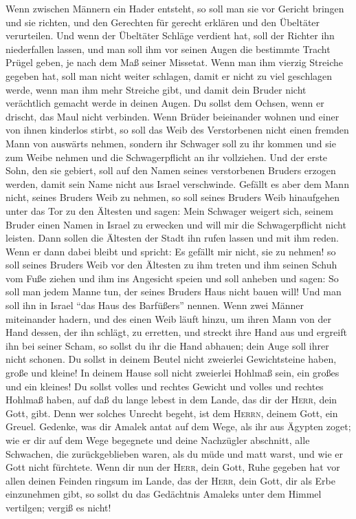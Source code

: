  Wenn zwischen Männern ein Hader entsteht, so soll man sie
vor Gericht bringen und sie richten, und den Gerechten für gerecht
erklären und den Übeltäter verurteilen.  Und wenn der
Übeltäter Schläge verdient hat, soll der Richter ihn niederfallen
lassen, und man soll ihm vor seinen Augen die bestimmte Tracht Prügel
geben, je nach dem Maß seiner Missetat.  Wenn man ihm
vierzig Streiche gegeben hat, soll man nicht weiter schlagen, damit er
nicht zu viel geschlagen werde, wenn man ihm mehr Streiche gibt, und
damit dein Bruder nicht verächtlich gemacht werde in deinen Augen.
 Du sollst dem Ochsen, wenn er drischt, das Maul nicht
verbinden.  Wenn Brüder beieinander wohnen und einer von
ihnen kinderlos stirbt, so soll das Weib des Verstorbenen nicht einen
fremden Mann von auswärts nehmen, sondern ihr Schwager soll zu ihr
kommen und sie zum Weibe nehmen und die Schwagerpflicht an ihr
vollziehen.  Und der erste Sohn, den sie gebiert, soll auf
den Namen seines verstorbenen Bruders erzogen werden, damit sein Name
nicht aus Israel verschwinde.  Gefällt es aber dem Mann
nicht, seines Bruders Weib zu nehmen, so soll seines Bruders Weib
hinaufgehen unter das Tor zu den Ältesten und sagen: Mein Schwager
weigert sich, seinem Bruder einen Namen in Israel zu erwecken und will
mir die Schwagerpflicht nicht leisten.  Dann sollen die
Ältesten der Stadt ihn rufen lassen und mit ihm reden. Wenn er dann
dabei bleibt und spricht: Es gefällt mir nicht, sie zu nehmen!
 so soll seines Bruders Weib vor den Ältesten zu ihm
treten und ihm seinen Schuh vom Fuße ziehen und ihm ins Angesicht speien
und soll anheben und sagen: So soll man jedem Manne tun, der seines
Bruders Haus nicht bauen will!  Und man soll ihn in
Israel ``das Haus des Barfüßers'' nennen.  Wenn zwei
Männer miteinander hadern, und des einen Weib läuft hinzu, um ihren Mann
von der Hand dessen, der ihn schlägt, zu erretten, und streckt ihre Hand
aus und ergreift ihn bei seiner Scham,  so sollst du ihr
die Hand abhauen; dein Auge soll ihrer nicht schonen.  Du
sollst in deinem Beutel nicht zweierlei Gewichtsteine haben, große und
kleine!  In deinem Hause soll nicht zweierlei Hohlmaß
sein, ein großes und ein kleines!  Du sollst volles und
rechtes Gewicht und volles und rechtes Hohlmaß haben, auf daß du lange
lebest in dem Lande, das dir der \textsc{Herr}, dein Gott, gibt.
 Denn wer solches Unrecht begeht, ist dem \textsc{Herrn},
deinem Gott, ein Greuel.  Gedenke, was dir Amalek antat
auf dem Wege, als ihr aus Ägypten zoget;  wie er dir auf
dem Wege begegnete und deine Nachzügler abschnitt, alle Schwachen, die
zurückgeblieben waren, als du müde und matt warst, und wie er Gott nicht
fürchtete.  Wenn dir nun der \textsc{Herr}, dein Gott,
Ruhe gegeben hat vor allen deinen Feinden ringsum im Lande, das der
\textsc{Herr}, dein Gott, dir als Erbe einzunehmen gibt, so sollst du
das Gedächtnis Amaleks unter dem Himmel vertilgen; vergiß es nicht!

